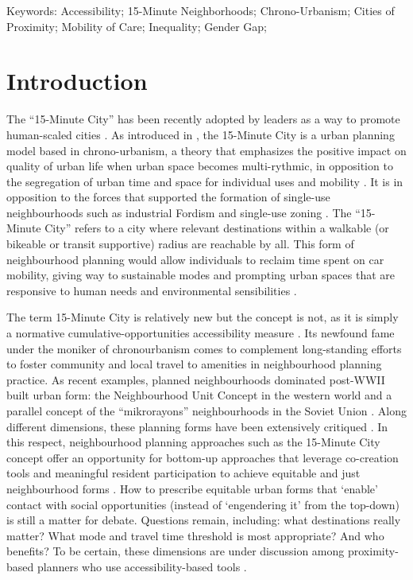 \documentclass[
  authoryear,
  preprint,
  3p]{elsarticle}
\begin{document}
Keywords: Accessibility; 15-Minute Neighborhoods; Chrono-Urbanism;
Cities of Proximity; Mobility of Care; Inequality; Gender Gap;

\section{Introduction}\label{introduction}

The ``15-Minute City'' has been recently adopted by leaders as a way to
promote human-scaled cities
\citep{teixeiraClassifying15minuteCities2024}. As introduced in
\citet{moreno_introducing_2021}, the 15-Minute City is a urban planning
model based in chrono-urbanism, a theory that emphasizes the positive
impact on quality of urban life when urban space becomes multi-rythmic,
in opposition to the segregation of urban time and space for individual
uses and mobility
\citep{mulicekUrbanRhythmsChronotopic2015, morenoVilleQuartHeure2016}.
It is in opposition to the forces that supported the formation of
single-use neighbourhoods such as industrial Fordism and single-use
zoning
\citep{mulicekUrbanRhythmsChronotopic2015, morenoVilleQuartHeure2016}.
The ``15-Minute City'' refers to a city where relevant destinations
within a walkable (or bikeable or transit supportive) radius are
reachable by all. This form of neighbourhood planning would allow
individuals to reclaim time spent on car mobility, giving way to
sustainable modes and prompting urban spaces that are responsive to
human needs and environmental sensibilities \citep{Allam2022}.

The term 15-Minute City is relatively new but the concept is not, as it
is simply a normative cumulative-opportunities accessibility measure
\citep{paez_measuring_2012}. Its newfound fame under the moniker of
chronourbanism comes to complement long-standing efforts to foster
community and local travel to amenities in neighbourhood planning
practice. As recent examples, planned neighbourhoods dominated post-WWII
built urban form: the Neighbourhood Unit Concept in the western world
\citep{brodyNeighbourhoodUnitConcept2013} and a parallel concept of the
``mikrorayons'' neighbourhoods in the Soviet Union
\citep{kissfazekasCircleParadigms15minute2022}. Along different
dimensions, these planning forms have been extensively critiqued
\citep{talenSocialSciencePlanned2017}. In this respect, neighbourhood
planning approaches such as the 15-Minute City concept offer an
opportunity for bottom-up approaches that leverage co-creation tools and
meaningful resident participation to achieve equitable and just
neighbourhood forms \citep{mahmoudCocreationPathwayUrban2021}. How to
prescribe equitable urban forms that `enable' contact with social
opportunities (instead of `engendering it' from the top-down) is still a
matter for debate. Questions remain, including: what destinations really
matter? What mode and travel time threshold is most appropriate? And who
benefits? To be certain, these dimensions are under discussion among
proximity-based planners who use accessibility-based tools
\citep{silvaProximitycentredAccessibilityConceptual2023, silvaRegionalAccessibilityUndermining2022, guzmanProximityEnoughCritical2024}.
\end{document}
